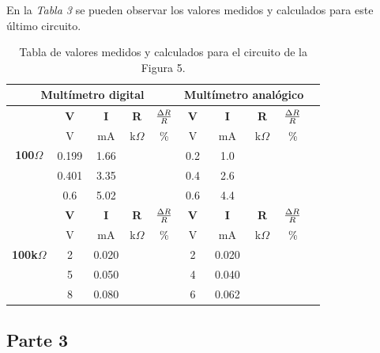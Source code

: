 \documentclass{article}
\begin{document}
	En la \textit{Tabla 3} se pueden observar los valores medidos y calculados para este último circuito.
\bigskip

\begin{table}[!hbt]
	\begin{center}

		\begin{tabular}{|c|c|c|c|c|c|c|c|c|c|} \hline
			\multicolumn{5}{|c|}{\textbf{Multímetro digital}} & \multicolumn{4}{|c|}{\textbf{Multímetro analógico}} \\ \hline
			\multirow{5}{*}{\textbf{100$\Omega$}} 
			& \textbf{V} & \textbf{I} & \textbf{R} & \textbf{${\Delta R \over R}$} & \textbf{V} & \textbf{I} & \textbf{R} & \textbf{${\Delta R \over R}$} \\\cline{2-9}
			& V & mA & k$\Omega$ & \% & V & mA & k$\Omega$ & \% \\\cline{2-9}
			& 0.199 & 1.66 &  &  & 0.2 & 1.0 &  &  \\\cline{2-9}
			& 0.401 & 3.35 &  &  & 0.4 & 2.6 &  &  \\\cline{2-9}
			& 0.6 & 5.02 &  &  & 0.6 & 4.4 &  &  \\ \hline
			\multirow{5}{*}{\textbf{100k$\Omega$}} 
			& \textbf{V} & \textbf{I} & \textbf{R} & \textbf{${\Delta R \over R}$} & \textbf{V} & \textbf{I} & \textbf{R} & \textbf{${\Delta R \over R}$} \\\cline{2-9}
			& V & mA & k$\Omega$ & \% & V & mA & k$\Omega$ & \% \\\cline{2-9}
			& 2 & 0.020 &  &  & 2 & 0.020 &  &  \\\cline{2-9}
			& 5 & 0.050 &  &  & 4 & 0.040 &  &  \\\cline{2-9}
			& 8 & 0.080 &  &  & 6 & 0.062 &  &  \\ \hline
		\end{tabular}

	\caption{Tabla de valores medidos y calculados para el circuito de la Figura 5.}
	\end{center}
\end{table}
\bigskip





\subsection{Parte 3}
\end{document}
